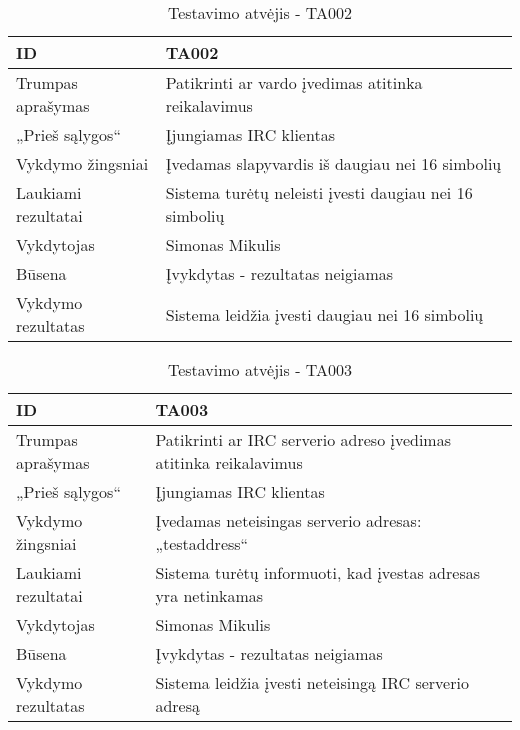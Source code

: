 \begin{table}[H]
  \centering
  \label{table:TA002}
  \begin{tabular}{|l|l|}
    \hline
    ID                  & TA002                                                                  \\ \hline
    Trumpas aprašymas   & Patikrinti ar vardo įvedimas atitinka reikalavimus                     \\ \hline
    „Prieš sąlygos“     & Įjungiamas IRC klientas                                                \\ \hline
    Vykdymo žingsniai   & Įvedamas slapyvardis iš daugiau nei 16 simbolių                        \\ \hline
    Laukiami rezultatai & Sistema turėtų neleisti įvesti daugiau nei 16 simbolių                 \\ \hline
    Vykdytojas          & Simonas Mikulis                                                        \\ \hline
    Būsena              & Įvykdytas - rezultatas neigiamas                                       \\ \hline
    Vykdymo rezultatas  & \cellcolor[HTML]{FF0000}Sistema leidžia įvesti daugiau nei 16 simbolių \\ \hline
  \end{tabular}
  \caption{Testavimo atvėjis - TA002}
\end{table}

\begin{table}[H]
  \centering
  \label{table:TA003}
  \begin{tabular}{|l|l|}
    \hline
    ID                  & TA003                                                                         \\ \hline
    Trumpas aprašymas   & Patikrinti ar IRC serverio adreso įvedimas atitinka reikalavimus              \\ \hline
    „Prieš sąlygos“     & Įjungiamas IRC klientas                                                       \\ \hline
    Vykdymo žingsniai   & Įvedamas neteisingas serverio adresas: „testaddress“                          \\ \hline
    Laukiami rezultatai & Sistema turėtų informuoti, kad įvestas adresas yra netinkamas                 \\ \hline
    Vykdytojas          & Simonas Mikulis                                                               \\ \hline
    Būsena              & Įvykdytas - rezultatas neigiamas                                              \\ \hline
    Vykdymo rezultatas  & \cellcolor[HTML]{FF0000}Sistema leidžia įvesti neteisingą IRC serverio adresą \\ \hline
  \end{tabular}
  \caption{Testavimo atvėjis - TA003}
\end{table}

